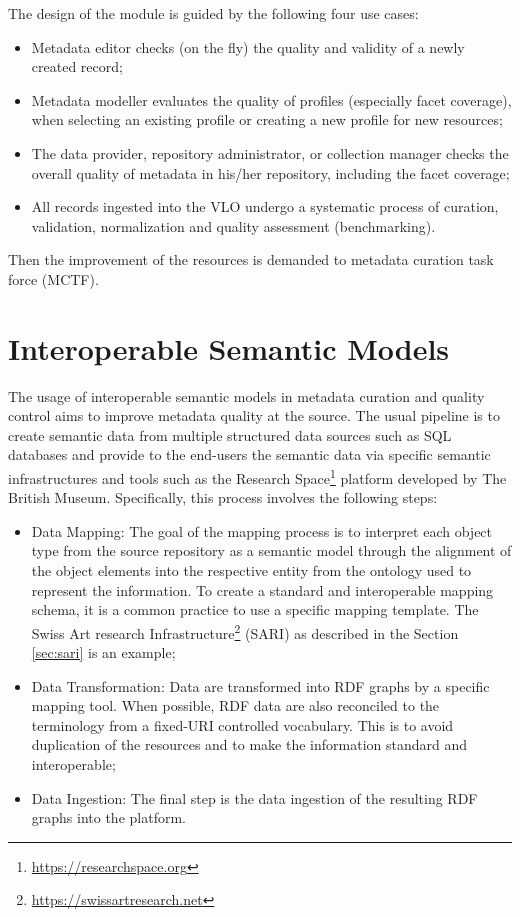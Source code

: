 \documentclass[epsfig,a4paper,12pt,titlepage]{book}
\begin{document}
	
 The design of the module is guided by the following four use cases:
\begin{itemize}
\item Metadata editor checks (on the fly) the quality and validity of a newly created record;
\item Metadata modeller evaluates the quality of profiles (especially facet coverage), when selecting an existing profile or creating a new profile for new resources;
\item The data provider, repository administrator, or collection manager checks the overall quality of
metadata in his/her repository, including the facet coverage;
\item All records ingested into the VLO undergo a systematic process of curation, validation, normalization and quality assessment (benchmarking).
\end{itemize}
Then the improvement of the resources is demanded to metadata curation task force (MCTF). 

\section{Interoperable Semantic Models}

The usage of interoperable semantic models in metadata curation and quality control aims to improve metadata quality at the source. The usual pipeline is to create semantic data from multiple structured data sources such as SQL databases and provide to the end-users the semantic data via specific semantic infrastructures and tools such as the Research Space\footnote{\url{https://researchspace.org}} platform developed by The British Museum. Specifically, this process involves the following steps:
\begin{itemize}
\item Data Mapping: The goal of the mapping process is to interpret each object type from the source repository as a semantic model through the alignment of the object elements into the respective entity from the ontology used to represent the information. To create a standard and interoperable mapping schema, it is a common practice to use a specific mapping template. The Swiss Art research Infrastructure\footnote{\url{https://swissartresearch.net}} (SARI) as described in the Section \ref{sec:sari} is an example; 
\item Data Transformation: Data are transformed into RDF graphs by a specific mapping tool.  When possible, RDF data are also reconciled to the terminology from a fixed-URI controlled vocabulary. This is to avoid duplication of the resources and to make the information standard and interoperable; 
\item Data Ingestion: The final step is the data ingestion of the resulting RDF graphs into the platform.
\end{itemize}
\end{document}
